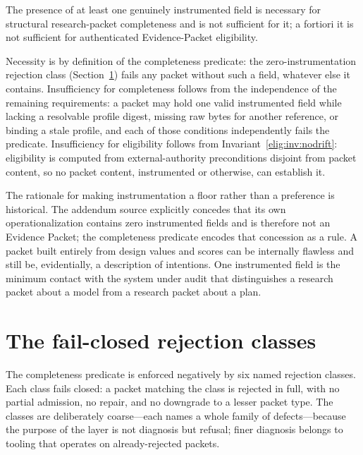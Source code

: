 \begin{proposition}\label{elig:prop:instrumented}
The presence of at least one genuinely instrumented field is necessary for structural research-packet completeness and is not sufficient for it; a fortiori it is not sufficient for authenticated Evidence-Packet eligibility.
\end{proposition}

\begin{designargument}
Necessity is by definition of the completeness predicate: the zero-instrumentation rejection class (Section~\ref{elig:sec:failclosed}) fails any packet without such a field, whatever else it contains. Insufficiency for completeness follows from the independence of the remaining requirements: a packet may hold one valid instrumented field while lacking a resolvable profile digest, missing raw bytes for another reference, or binding a stale profile, and each of those conditions independently fails the predicate. Insufficiency for eligibility follows from Invariant~\ref{elig:inv:nodrift}: eligibility is computed from external-authority preconditions disjoint from packet content, so no packet content, instrumented or otherwise, can establish it.
\end{designargument}

The rationale for making instrumentation a floor rather than a preference is historical. The addendum source explicitly concedes that its own operationalization contains zero instrumented fields and is therefore not an Evidence Packet; the completeness predicate encodes that concession as a rule. A packet built entirely from design values and scores can be internally flawless and still be, evidentially, a description of intentions. One instrumented field is the minimum contact with the system under audit that distinguishes a research packet about a model from a research packet about a plan.

\section{The fail-closed rejection classes}\label{elig:sec:failclosed}

The completeness predicate is enforced negatively by six named rejection classes. Each class fails closed: a packet matching the class is rejected in full, with no partial admission, no repair, and no downgrade to a lesser packet type. The classes are deliberately coarse---each names a whole family of defects---because the purpose of the layer is not diagnosis but refusal; finer diagnosis belongs to tooling that operates on already-rejected packets.

